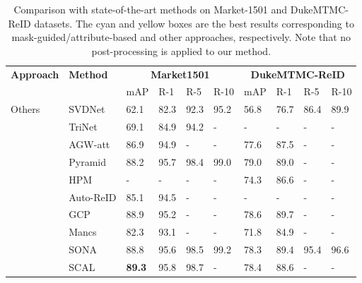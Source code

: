 \documentclass[final]{cvpr}
\begin{document}
\begin{table*}[!t]
	\caption{Comparison with state-of-the-art methods on Market-1501 \cite{market1501} and DukeMTMC-ReID \cite{dukemtmc} datasets. The cyan and yellow boxes are the best results corresponding to mask-guided/attribute-based and other approaches, respectively. Note that no post-processing is applied to our method.}
	\centering
	\begin{center}
		\begin{tabular}{p{2.5cm}| p{2.6cm} |p{0.7cm} |p{0.7cm} |p{0.7cm} |p{0.8cm}|p{0.7cm} |p{0.7cm} |p{0.7cm} |p{0.8cm}} 
			\hline
			\multirow{2}{*}{\textbf{Approach}}   & \multirow{2}{*}{\textbf{Method}}       & \multicolumn{4}{c|}{\textbf{Market1501}} & \multicolumn{4}{c}{\textbf{DukeMTMC-ReID}} \\ \cline{3-10}
			                            &                               &mAP   &R-1   &R-5   &R-10   &mAP    &R-1    &R-5    &R-10    \\
			\hline
			\hline
			\multirow{19}{*}{Others}     &SVDNet \cite{svdnet}           &62.1   &82.3   &92.3   &95.2   &56.8	&76.7	&86.4	&89.9       \\
			                            &TriNet \cite{triplet}          &69.1   &84.9   &94.2   &-      &-      &-      &-      &-          \\
&AGW-att \cite{ye2020deep} &86.9    &94.9    &-  &-  &77.6   &87.5    &-  &-   \\
			                            &Pyramid \cite{pyramid}         &88.2   &95.7	&98.4	&99.0   &79.0	&89.0   &-      &-          \\
			                            &HPM \cite{hpm}                 &-      &-      &-      &-      &74.3	&86.6   &-      &-          \\
			                            &Auto-ReID \cite{auto-reid}	  	&85.1	&94.5	&-	    &-       &-      &-      &-      &-         \\
                                        &GCP \cite{gcp}                 &88.9	&95.2   &-      &-      &78.6	&89.7   &-      &-          \\
                                        &Mancs \cite{mancs}             &82.3	&93.1	&-      &-      &71.8	&84.9   &-      &-	        \\
                                        &SONA \cite{sona}       &88.8	&95.6	&98.5	&99.2   &78.3	&89.4	&95.4	&96.6       \\
                                        &SCAL \cite{scal}      &\cellcolor[HTML]{F3F4BE}\textbf{89.3}	&95.8	&98.7   &-      &78.4	&88.6   &-      &-      \\

\end{tabular}
\end{center}
\end{table*}
\end{document}
